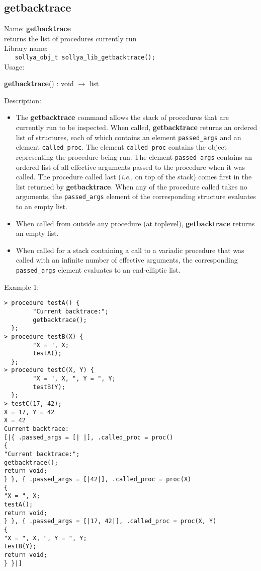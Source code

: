 \subsection{getbacktrace}
\label{labgetbacktrace}
\noindent Name: \textbf{getbacktrace}\\
\phantom{aaa}returns the list of \sollya procedures currently run\\[0.2cm]
\noindent Library name:\\
\verb|   sollya_obj_t sollya_lib_getbacktrace();|\\[0.2cm]
\noindent Usage: 
\begin{center}
\textbf{getbacktrace}() : \textsf{void} $\rightarrow$ \textsf{list}\\
\end{center}
\noindent Description: \begin{itemize}

\item The \textbf{getbacktrace} command allows the stack of \sollya procedures that are
   currently run to be inspected. When called, \textbf{getbacktrace} returns an
   ordered list of structures, each of which contains an element
   \verb|passed_args| and an element \verb|called_proc|. The element \verb|called_proc|
   contains the \sollya object representing the procedure being run. The
   element \verb|passed_args| contains an ordered list of all effective
   arguments passed to the procedure when it was called. The procedure called
   last (\emph{i.e.}, on top of the stack) comes first in the list returned
   by \textbf{getbacktrace}. When any of the procedure called takes no arguments, the
   \verb|passed_args| element of the corresponding structure evaluates to an empty
   list.

\item When called from outside any procedure (at toplevel), \textbf{getbacktrace} returns
   an empty list.

\item When called for a stack containing a call to a variadic procedure that was
   called with an infinite number of effective arguments, the corresponding
   \verb|passed_args| element evaluates to an end-elliptic list.
\end{itemize}
\noindent Example 1: 
\begin{center}\begin{minipage}{15cm}\begin{Verbatim}[frame=single]
> procedure testA() {
        "Current backtrace:";
        getbacktrace();
  };
> procedure testB(X) {
        "X = ", X;
        testA();
  };
> procedure testC(X, Y) {
        "X = ", X, ", Y = ", Y;
        testB(Y);
  };
> testC(17, 42);
X = 17, Y = 42
X = 42
Current backtrace:
[|{ .passed_args = [| |], .called_proc = proc()
{
"Current backtrace:";
getbacktrace();
return void;
} }, { .passed_args = [|42|], .called_proc = proc(X)
{
"X = ", X;
testA();
return void;
} }, { .passed_args = [|17, 42|], .called_proc = proc(X, Y)
{
"X = ", X, ", Y = ", Y;
testB(Y);
return void;
} }|]
\end{Verbatim}
\end{minipage}\end{center}
